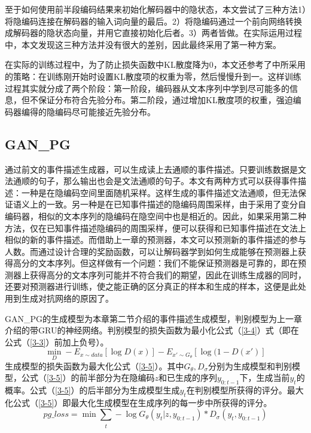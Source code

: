 至于如何使用前半段编码结果来初始化解码器中的隐状态，本文尝试了三种方法1）将隐编码连接在解码器的输入词向量的最后。2）将隐编码通过一个前向网络转换成解码器的隐状态向量，并用它直接初始化后者。3）两者皆做。在实际运用过程中，本文发现这三种方法并没有很大的差别，因此最终采用了第一种方案。

在实际的训练过程中，为了防止损失函数中KL散度降为0，本文还参考了中所采用的策略：在训练刚开始时设置KL散度项的权重为零，然后慢慢升到一。这样训练过程其实就分成了两个阶段：第一阶段，编码器从文本序列中学到尽可能多的信息，但不保证分布符合先验分布。第二阶段，通过增加KL散度项的权重，强迫编码器编得的隐编码尽可能接近先验分布。

\subsection{GAN\_PG}
通过前文的事件描述生成器，可以生成读上去通顺的事件描述。只要训练数据是文法通顺的句子，那么输出也会是文法通顺的句子。本文有两种方式可以获得事件描述：一种是在隐编码空间里面随机采样。这样生成的事件描述文法通顺，但无法保证语义上的一致。另一种是在已知事件描述的隐编码周围采样，由于采用了变分自编码器，相似的文本序列的隐编码在隐空间中也是相近的。因此，如果采用第二种方法，仅在已知事件描述隐编码的周围采样，便可以获得和已知事件描述在文法上相似的新的事件描述。而借助上一章的预测器，本文可以预测新的事件描述的参与人数。而通过设计合理的奖励函数，可以让解码器学到如何生成能够在预测器上获得高分的文本序列。但这样做有一个问题：我们不能保证预测器是可靠的，即在预测器上获得高分的文本序列可能并不符合我们的期望，因此在训练生成器的同时，还要对预测器进行训练，使之能正确的区分真正的样本和生成的样本，这便是此处用到生成对抗网络的原因了。

GAN\_PG的生成模型为本章第二节介绍的事件描述生成模型，判别模型为上一章介绍的带GRU的神经网络。判别模型的损失函数为最小化公式（\ref{3-4}）式（即在公式（\ref{3-3}）前加上负号）。
\begin{equation}\label{3-4}
    \mathop{min}_D-E_{x\sim data}[\log D(x)]-E_{x'\sim G_\theta}[\log(1-D(x')]
\end{equation}
生成模型的损失函数为最大化公式（\ref{3-5}）。其中$G_\theta,D_\sigma$分别为生成模型和判别模型，公式（\ref{3-5}）的前半部分为在隐编码$z$和已生成的序列$y_{0:t-1}$下，生成当前$y_t$的概率。公式（\ref{3-5}）的后半部分为生成模型生成$y_t$在判别模型所获得的评分。最大化公式（\ref{3-5}）即最大化生成模型在生成序列的每一步中所获得的评分。
\begin{equation}\label{3-5}
pg\_loss=\mathop{min}\sum_{\substack{t}}-\log G_\theta (y_t|z,y_{0:t-1})*D_\sigma (y_t,y_{0:t-1})
\end{equation}

